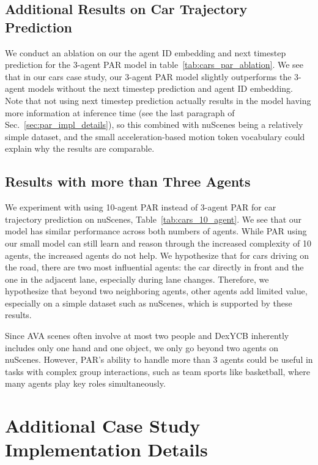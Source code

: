 \subsection{Additional Results on Car Trajectory Prediction}

We conduct an ablation on our the agent ID embedding and next timestep prediction for the 3-agent PAR model in table~\ref{tab:cars_par_ablation}. We see that in our cars case study, our 3-agent PAR model slightly outperforms the 3-agent models without the next timestep prediction and agent ID embedding. Note that not using next timestep prediction actually results in the model having more information at inference time (see the last paragraph of Sec.~\ref{sec:par_impl_details}), so this combined with nuScenes being a relatively simple dataset, and the small acceleration-based motion token vocabulary could explain why the results are comparable.

\subsection{Results with more than Three Agents}

We experiment with using 10-agent PAR instead of 3-agent PAR for car trajectory prediction on nuScenes, Table~\ref{tab:cars_10_agent}. We see that our model has similar performance across both numbers of agents. While PAR using our small model can still learn and reason through the increased complexity of 10 agents, the increased agents do not help. We hypothesize that for cars driving on the road, there are two most influential agents: the car directly in front and the one in the adjacent lane, especially during lane changes. Therefore, we hypothesize that beyond two neighboring agents, other agents add limited value, especially on a simple dataset such as nuScenes, which is supported by these results.

Since AVA scenes often involve at most two people and DexYCB inherently includes only one hand and one object, we only go beyond two agents on nuScenes. However, PAR’s ability to handle more than 3 agents could be useful in tasks with complex group interactions, such as team sports like basketball, where many agents play key roles simultaneously.

\section{Additional Case Study Implementation Details}

